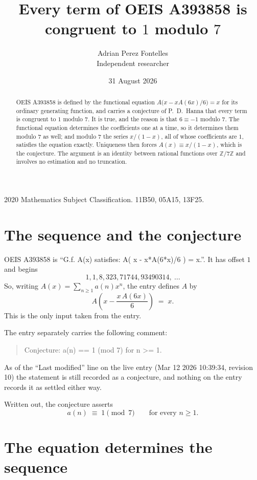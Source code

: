 \documentclass[11pt,a4paper]{article}
\title{Every term of OEIS A393858 is congruent to $1$ modulo $7$}
\author{Adrian Perez Fontelles\\ \small Independent researcher}
\date{31 August 2026}
\theoremstyle{plain}
\theoremstyle{definition}
\begin{document}
\maketitle

\begin{abstract}
OEIS A393858 is defined by the functional equation $A\bigl(x-xA(6x)/6\bigr)=x$ for its
ordinary generating function, and carries a conjecture of P.~D.~Hanna that every term is
congruent to $1$ modulo $7$. It is true, and the reason is that $6\equiv-1$ modulo
$7$. The functional equation determines the coefficients one at a time, so it determines
them modulo $7$ as well; and modulo $7$ the series $x/(1-x)$, all of whose coefficients
are $1$, satisfies the equation exactly. Uniqueness then forces $A(x)\equiv x/(1-x)$, which
is the conjecture. The argument is an identity between rational functions over
$\mathbb{Z}/7\mathbb{Z}$ and involves no estimation and no truncation.
\end{abstract}

\noindent\small 2020 Mathematics Subject Classification. 11B50, 05A15, 13F25.\normalsize

\section{The sequence and the conjecture}

OEIS A393858 is ``G.f. A(x) satisfies: A( x - x*A(6*x)/6 ) = x.''. It has offset $1$ and begins
\[
1, 1, 8, 323, 71744, 93490314,\ \dots
\]
So, writing $A(x)=\sum_{n\ge1}a(n)x^{n}$, the entry defines $A$ by
\begin{equation}\label{eq:fe}
A\!\left(x-\frac{x\,A(6x)}{6}\right)\;=\;x .
\end{equation}
This is the only input taken from the entry.

The entry separately carries the following comment:
\begin{quote}\small
Conjecture: a(n) == 1 (mod 7) for n >= 1.
\end{quote}
As of the ``Last modified'' line on the live entry (Mar 12 2026 10:39:34, revision 10) the statement is
still recorded as a conjecture, and nothing on the entry records it as settled either way.

Written out, the conjecture asserts
\begin{equation}\label{eq:conj}
a(n)\;\equiv\;1 \pmod{7}\qquad\text{for every } n\ge1 .
\end{equation}

\section{The equation determines the sequence}
\end{document}

